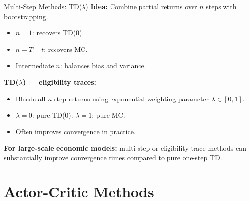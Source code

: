 \documentclass[10pt,english,aspectratio=169]{beamer}
\begin{document}
\begin{frame}{Multi-Step Methods: TD($\lambda$)}
    \textbf{Idea:} Combine partial returns over $n$ steps with bootstrapping.
    \begin{itemize}
        \item $n = 1$: recovers TD(0).
        \item $n = T - t$: recovers MC.
        \item Intermediate $n$: balances bias and variance.
    \end{itemize}

    \vspace{0.3cm}
    \textbf{TD($\lambda$) --- eligibility traces:}
    \begin{itemize}
        \item Blends all $n$-step returns using exponential weighting parameter $\lambda \in [0,1]$.
        \item $\lambda = 0$: pure TD(0). \quad $\lambda = 1$: pure MC.
        \item Often improves convergence in practice.
    \end{itemize}

    \vspace{0.3cm}
    \textbf{For large-scale economic models:} multi-step or eligibility trace methods can substantially improve convergence times compared to pure one-step TD.
\end{frame}


\section{Actor-Critic Methods}
\end{document}
